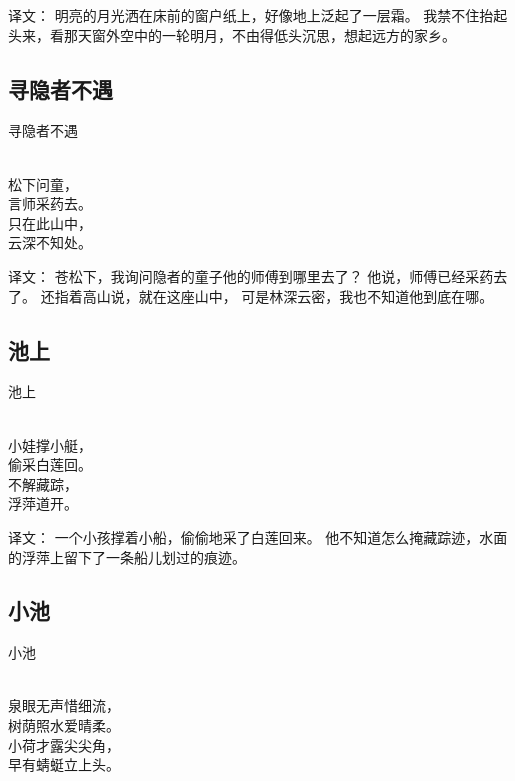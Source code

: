 译文：
明亮的月光洒在床前的窗户纸上，好像地上泛起了一层霜。 我禁不住抬起头来，看那天窗外空中的一轮明月，不由得低头沉思，想起远方的家乡。

\subsection{寻隐者不遇}
\begin{pinyinscope}
	\noindent \huge 寻隐者不遇
	
	  \\
	
	\noindent 松下问童，\\言师采药去。\\
	只在此山中，\\云深不知处。
\end{pinyinscope}

译文：
苍松下，我询问隐者的童子他的师傅到哪里去了？
他说，师傅已经采药去了。
还指着高山说，就在这座山中，
可是林深云密，我也不知道他到底在哪。

\subsection{池上}
\begin{pinyinscope}
	\noindent \huge 池上
	
	  \\
	
	\noindent 小娃撑小艇，\\偷采白莲回。\\
	不解藏踪，\\浮萍道开。
\end{pinyinscope}

译文：
一个小孩撑着小船，偷偷地采了白莲回来。
他不知道怎么掩藏踪迹，水面的浮萍上留下了一条船儿划过的痕迹。

\subsection{小池}
\begin{pinyinscope}
	\noindent \huge 小池
	
	  \\
	
	\noindent 泉眼无声惜细流，\\树荫照水爱晴柔。\\
	小荷才露尖尖角，\\早有蜻蜓立上头。
\end{pinyinscope}

